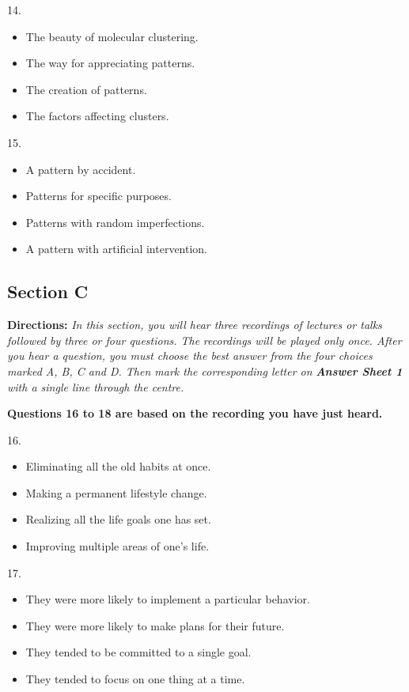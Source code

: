 \documentclass[UTF8,11pt]{ctexart}
\begin{document}
14.


\begin{itemize}[leftmargin=2em,itemsep=.2em,topsep=.4em]\item[A.] The beauty of molecular clustering.
\item[B.] The way for appreciating patterns.
\item[C.] The creation of patterns.
\item[D.] The factors affecting clusters.
\end{itemize}

15.


\begin{itemize}[leftmargin=2em,itemsep=.2em,topsep=.4em]\item[A.] A pattern by accident.
\item[B.] Patterns for specific purposes.
\item[C.] Patterns with random imperfections.
\item[D.] A pattern with artificial intervention.
\end{itemize}

\subsection*{\textbf{Section C}}


\textbf{Directions:}\textit{ In this section, you will hear three recordings of lectures or talks followed by three or four questions. The} \textit{recordings will be played only once. After you hear a question, you must choose the best answer from the four choices} \textit{marked A, B, C and D. Then mark the corresponding letter on }\textbf{\textit{Answer Sheet 1}}\textit{ with a single line through the centre.}


\textbf{Questions 16 to 18 are based on the recording you have just heard.}


16.


\begin{itemize}[leftmargin=2em,itemsep=.2em,topsep=.4em]\item[A.] Eliminating all the old habits at once.
\item[B.] Making a permanent lifestyle change.
\item[C.] Realizing all the life goals one has set.
\item[D.] Improving multiple areas of one’s life.
\end{itemize}

17.


\begin{itemize}[leftmargin=2em,itemsep=.2em,topsep=.4em]\item[A.] They were more likely to implement a particular behavior.
\item[B.] They were more likely to make plans for their future.
\item[C.] They tended to be committed to a single goal.
\item[D.] They tended to focus on one thing at a time.
\end{itemize}
\end{document}
